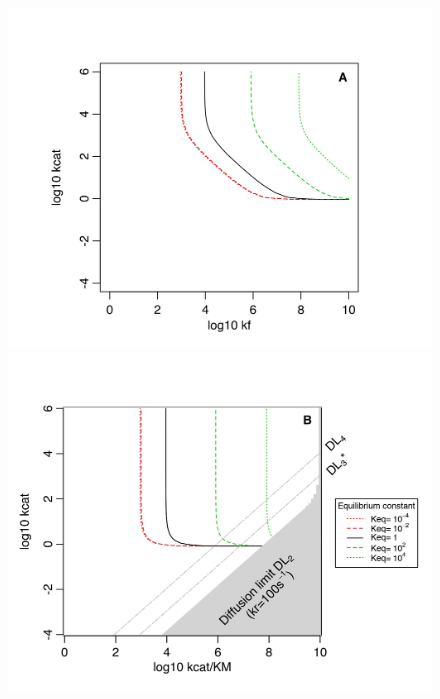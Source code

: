 \begin{figure}[h!]
\centering
\begin{minipage}[c]{0.49\linewidth}
\hspace{-1.3cm}
\includegraphics[scale=0.58,trim=0cm 0cm 0cm 1.5cm,clip]{pics/SM-Enzymes/2DFitLandscape_Multiple_Reverse_HighFlux.jpeg} 
\end{minipage} \hspace{-1.3cm}
\begin{minipage}[c]{0.49\linewidth}
\includegraphics[scale=0.58,trim=0cm 0cm 0cm 1.5cm,clip]{pics/SM-Enzymes/2DFitLandscape_Multiple_Reverse_exp_par_HighFlux.jpeg}

\end{minipage}
\end{figure}
